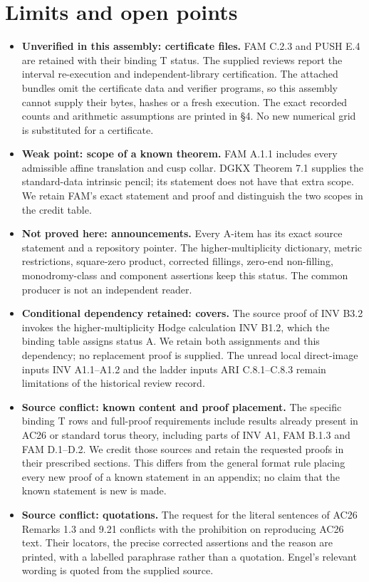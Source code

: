 \section*{Limits and open points}\label{sec:limits}
\begin{itemize}[leftmargin=*]
\item \textbf{Unverified in this assembly: certificate files.} FAM C.2.3 and PUSH E.4 are retained with their binding T status. The supplied reviews report the interval re-execution and independent-library certification. The attached bundles omit the certificate data and verifier programs, so this assembly cannot supply their bytes, hashes or a fresh execution. The exact recorded counts and arithmetic assumptions are printed in \S4. No new numerical grid is substituted for a certificate.
\item \textbf{Weak point: scope of a known theorem.} FAM A.1.1 includes every admissible affine translation and cusp collar. DGKX Theorem 7.1 supplies the standard-data intrinsic pencil; its statement does not have that extra scope. We retain FAM's exact statement and proof and distinguish the two scopes in the credit table.
\item \textbf{Not proved here: announcements.} Every A-item has its exact source statement and a repository pointer. The higher-multiplicity dictionary, metric restrictions, square-zero product, corrected fillings, zero-end non-filling, monodromy-class and component assertions keep this status. The common producer is not an independent reader.
\item \textbf{Conditional dependency retained: covers.} The source proof of INV B3.2 invokes the higher-multiplicity Hodge calculation INV B1.2, which the binding table assigns status A. We retain both assignments and this dependency; no replacement proof is supplied. The unread local direct-image inputs INV A1.1--A1.2 and the ladder inputs ARI C.8.1--C.8.3 remain limitations of the historical review record.
\item \textbf{Source conflict: known content and proof placement.} The specific binding T rows and full-proof requirements include results already present in AC26 or standard torus theory, including parts of INV A1, FAM B.1.3 and FAM D.1--D.2. We credit those sources and retain the requested proofs in their prescribed sections. This differs from the general format rule placing every new proof of a known statement in an appendix; no claim that the known statement is new is made.
\item \textbf{Source conflict: quotations.} The request for the literal sentences of AC26 Remarks 1.3 and 9.21 conflicts with the prohibition on reproducing AC26 text. Their locators, the precise corrected assertions and the reason are printed, with a labelled paraphrase rather than a quotation. Engel's relevant wording is quoted from the supplied source.

\end{itemize}
